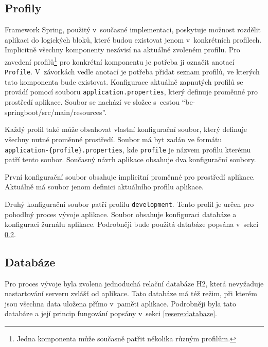     \subsection{Profily}\label{analyza:soucasnaImplementace:profily}
        Framework Spring, použitý v~současné implementaci, poskytuje možnost rozdělit aplikaci do logických bloků, které budou existovat jenom v~konkrétních profilech\cite{spring-profile}. Implicitně všechny komponenty nezávisí na aktuálně zvoleném profilu. Pro zavedení profilů\footnote{Jedna komponenta může současně patřit několika různým profilům.} pro konkrétní komponentu je potřeba ji označit anotací \texttt{Profile}. V~závorkách vedle anotací je potřeba přidat seznam profilů, ve kterých tato komponenta bude existovat. Konfigurace aktuálně zapnutých profilů se provádí pomocí souboru \texttt{application.properties}, který definuje proměnné pro prostředí aplikace. Soubor se nachází ve složce s~cestou \enquote{be-springboot/src/main/resources}.
    
        Každý profil také může obsahovat vlastní konfigurační soubor, který definuje všechny nutné proměnné prostředí. Soubor má byt zadán ve formátu \texttt{application-\{profile\}.properties}, kde \texttt{profile} je názvem profilu kterému patří tento soubor. Současný návrh aplikace obsahuje dva konfigurační soubory.
    
        První konfigurační soubor obsahuje implicitní proměnné pro prostředí aplikace. Aktuálně má soubor jenom definici aktuálního profilu aplikace. 
    
        Druhý konfigurační soubor patří profilu \texttt{development}. Tento profil je určen pro pohodlný proces vývoje aplikace. Soubor obsahuje konfiguraci databáze a konfiguraci žurnálu aplikace. Podrobněji bude použitá databáze popsána v~sekci \ref{analyza:soucasnaImplementace:databaze}.
        
    \subsection{Databáze}\label{analyza:soucasnaImplementace:databaze}
        Pro proces vývoje byla zvolena jednoduchá relační databáze H2, která nevyžaduje nastartování serveru zvlášť od aplikace. Tato databáze má též režim, při kterém jsou všechna data uložena přímo v~paměti aplikace. Podrobněji byla tato databáze a její princip fungování popsány v~sekci \ref{resere:databaze}.
    
